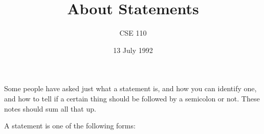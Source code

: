 



\def\brac#1{$<$#1$>$}
\def\Int{{\tt int}}
\def\int{\brac{\Int}}
\def\int{\brac{\Int}}
\def\Shortint{{\tt short~int}}
\def\shortint{\brac{\Shortint}}
\def\Longint{{\tt long~int}}
\def\longint{\brac{\Longint}}
\def\Float{{\tt float}}
\def\float{\brac{\Float}}
\def\Double{{\tt double}}
\def\double{\brac{\Double}}
\def\Char{{\tt char}}
\def\char{\brac{\Char}}
\def\Void{{\tt void}}
\def\void{\brac{\Void}}

\def\p2#1{\brac{pointer~to #1}}

\parskip 8pt

\title{About Statements}
\author{CSE 110}
\date{13 July 1992}


\maketitle

Some people have asked just what a statement is, and how you can
identify one, and how to tell if a certain thing should be followed by a
semicolon or not.  These notes should sum all that up.

A statement is one of the following forms:

